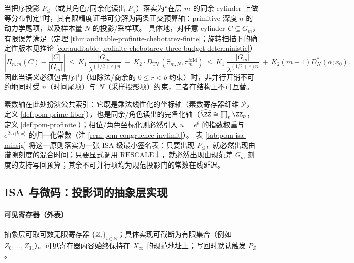 \begin{remark}\label{rem:pom-order-three-budget}
当把序投影 \(P_{\le}\)（或其角色/同余化读出 \(P_\chi\)）落实为“在层 \(m\) 的同余 cylinder 上做等分布判定”时，其有限精度证书可分解为两条正交预算轴：primitive 深度 \(n\) 的动力学尾项，以及样本量 \(N\) 的投影/采样项。
具体地，对任意 cylinder \(C\subseteq G_m\)，有限误差满足（定理 \ref{thm:auditable-profinite-chebotarev-finite}；旋转扫描下的确定性版本见推论 \ref{cor:auditable-profinite-chebotarev-three-budget-deterministic}）
\[
\left|\Pi_{n,m}(C)-\frac{|C|}{|G_m|}\right|
\ \le\
K_1\,\frac{|G_m|}{\lambda^{(1/2+\varepsilon)n}}
\ +\
K_2\cdot D_{\mathrm{TV}}(\hat{\pi}_{m,N},\pi_m^{\mathrm{fold}})
\ \le\
K_1\,\frac{|G_m|}{\lambda^{(1/2+\varepsilon)n}}
\ +\
K_2(m+1)D_N^*(\alpha;x_0).
\]
因此当语义必须包含序门（如除法/商余的 \(0\le r<b\) 约束）时，非并行开销不可约地同时受 \(n\)（时间尾项）与 \(N\)（采样投影项）约束，二者在结构上不可互替。
\end{remark}
素数轴在此处扮演公共索引：它既是乘法线性化的坐标轴（素数寄存器纤维 \(\mathcal{P}\)，定义 \ref{def:pom-prime-fiber}），也是同余/角色读出的完备化轴（\(\widehat{\ZZ}\cong\prod_p\ZZ_p\)，定义 \ref{def:pom-profinite}）；相位/角色坐标化则必然引入 \(u=e^\theta\) 的指数权重与 \(e^{2\pi i\langle k,x\rangle}\) 的归一化常数（注 \ref{rem:pom-congruence-invlimit}）。
表 \ref{tab:pom-isa-minsig} 将这一原则落实为一张 ISA 级最小签名表：只要出现 \(P_{\le}\)，就必然出现由谱隙刻度的混合时间；只要显式调用 \(\mathrm{RESCALE}\downarrow\)，就必然出现由规范差 \(G_m\) 刻度的支持写回预算；其余不可并行项均为规范投影门的常数在线延迟。

\subsection{ISA 与微码：投影词的抽象层实现}\label{subsec:pom-isa}
\paragraph{可见寄存器（外表）}
抽象层可取可数无限寄存器 $\{Z_i\}_{i\in\mathbb N}$；具体实现可截断为有限集合（例如 $Z_0,\dots,Z_{31}$）。可见寄存器内容始终保持在 $X_\infty$ 的规范地址上；写回时默认触发 $P_Z$。

